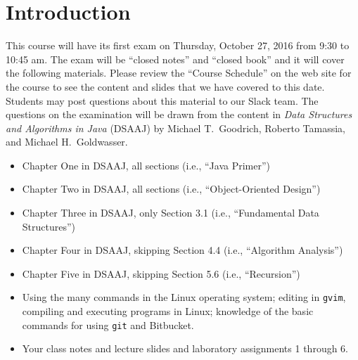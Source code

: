 


\vspace*{-.35in}
\section*{Introduction}

This course will have its first exam on Thursday, October 27, 2016 from 9:30 to 10:45 am. The exam will be ``closed
notes'' and ``closed book'' and it will cover the following materials. Please review the ``Course Schedule'' on the web
site for the course to see the content and slides that we have covered to this date. Students may post questions about
this material to our Slack team. The questions on the examination will be drawn from the content in {\em Data Structures
and Algorithms in Java\/} (DSAAJ) by Michael T.\ Goodrich, Roberto Tamassia, and Michael H.\ Goldwasser.

\begin{itemize}

  \itemsep 0in

  \item Chapter One in DSAAJ, all sections (i.e., ``Java Primer'')

  \item Chapter Two in DSAAJ, all sections (i.e., ``Object-Oriented Design'')

  \item Chapter Three in DSAAJ, only Section 3.1 (i.e., ``Fundamental Data Structures'')

  \item Chapter Four in DSAAJ, skipping Section 4.4 (i.e., ``Algorithm Analysis'')

  \item Chapter Five in DSAAJ, skipping Section 5.6 (i.e., ``Recursion'')

  \item Using the many commands in the Linux operating system; editing in {\tt gvim}, compiling and executing
    programs in Linux; knowledge of the basic commands for using {\tt git} and Bitbucket.

  \item Your class notes and lecture slides and laboratory assignments 1 through 6.

\end{itemize}

